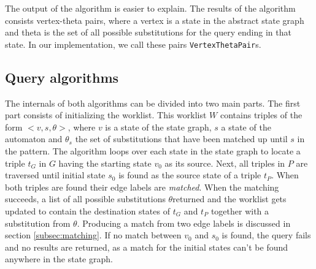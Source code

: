 The output of the algorithm is easier to explain. The results of the algorithm consists vertex-theta pairs, where a vertex is a state in the abstract state graph and theta is the set of all possible substitutions for the query ending in that state. In our implementation, we call these pairs \texttt{VertexThetaPair}s.

\subsection{Query algorithms}
\label{subsec:algorithms}

The internals of both algorithms can be divided into two main parts. The first part consists of initializing the worklist. This worklist $W$ contains triples of the form $<v, s, \theta>$, where $v$ is a state of the state graph, $s$ a state of the automaton and $\theta_s$ the set of substitutions that have been matched up until $s$ in the pattern. The algorithm loops over each state in the state graph to locate a triple $t_G$ in $G$ having the starting state $v_0$ as its source. Next, all triples in $P$ are traversed until initial state $s_0$ is found as the source state of a triple $t_P$. When both triples are found their edge labels are \textit{matched}. When the matching succeeds, a list of all possible substitutions $\theta$returned and the worklist gets updated to contain the destination states of $t_G$ and $t_P$ together with a substitution from $\theta$. Producing a match from two edge labels is discussed in section \ref{subsec:matching}. If no match between $v_0$ and $s_0$ is found, the query fails and no results are returned, as a match for the initial states can't be found anywhere in the state graph.

